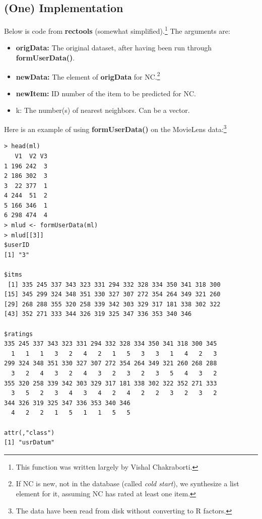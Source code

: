 \subsection{(One) Implementation}

Below is code from \textbf{rectools} (somewhat
simplified).\footnote{This function was written largely by Vishal
Chakraborti.} The arguments are:

\begin{itemize}

\item \textbf{origData:}  The original dataset, after having been run through
\textbf{formUserData()}. 

\item \textbf{newData:}  The element of \textbf{origData} for NC.\footnote{If
NC is new, not in the database (called \textit{cold start}), we
synthesize a list element for it, assuming NC has rated at least one
item.}

\item \textbf{newItem:}  ID number of the item to be predicted for NC.

\item k:  The number(s) of nearest neighbors.  Can be a vector.

\end{itemize} 

Here is an example of using \textbf{formUserData()} on the MovieLens
data:\footnote{The data have been read from disk without converting to R
factors.}

\begin{lstlisting}
> head(ml)
   V1  V2 V3
1 196 242  3
2 186 302  3
3  22 377  1
4 244  51  2
5 166 346  1
6 298 474  4
> mlud <- formUserData(ml)
> mlud[[3]]
$userID
[1] "3"

$itms
 [1] 335 245 337 343 323 331 294 332 328 334 350 341 318 300
[15] 345 299 324 348 351 330 327 307 272 354 264 349 321 260
[29] 268 288 355 320 258 339 342 303 329 317 181 338 302 322
[43] 352 271 333 344 326 319 325 347 336 353 340 346

$ratings
335 245 337 343 323 331 294 332 328 334 350 341 318 300 345 
  1   1   1   3   2   4   2   1   5   3   3   1   4   2   3 
299 324 348 351 330 327 307 272 354 264 349 321 260 268 288 
  3   2   4   3   2   4   3   2   3   2   3   5   4   3   2 
355 320 258 339 342 303 329 317 181 338 302 322 352 271 333 
  3   5   2   3   4   3   4   2   4   2   2   3   2   3   2 
344 326 319 325 347 336 353 340 346 
  4   2   2   1   5   1   1   5   5 

attr(,"class")
[1] "usrDatum"
\end{lstlisting}

